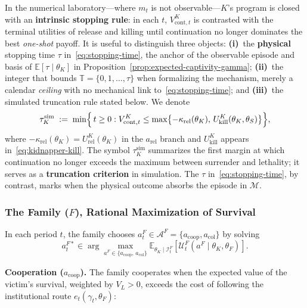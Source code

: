 \documentclass[12pt,a4paper]{article}
\theoremstyle{plain}
\theoremstyle{definition}
\theoremstyle{remark}
\newcommand{\E}{\mathbb{E}}
\newcommand{\1}{\mathbf{1}}
\begin{document}
In the numerical laboratory---where $m_t$ is not observable---$K$'s program is closed with an \textbf{intrinsic stopping rule}: in each $t$, $V^K_{\mathrm{cont},t}$ is contrasted with the terminal utilities of release and killing until continuation no longer dominates the best \emph{one-shot} payoff. It is useful to distinguish three objects: \textbf{(i)}~the \textbf{physical} stopping time $\tau$ in~\eqref{eq:stopping-time}, the anchor of the observable episode and basis of $\mathbb{E}[\tau\mid\theta_K]$ in Proposition~\ref{prop:expected-captivity-gamma}; \textbf{(ii)}~the integer that bounds $\mathbb{T}=\{0,1,\ldots,\tau\}$ when formalizing the mechanism, merely a calendar \emph{ceiling} with no mechanical link to~\eqref{eq:stopping-time}; and \textbf{(iii)}~the simulated truncation rule stated below. We denote
\begin{equation}
\label{eq:tau-K-pure-simulation}
\tau_K^{\mathrm{sim}}
\;:=\;
\min\Bigl\{\, t\ge 0 : V^K_{\mathrm{cont},t} \le \max\bigl\{-\kappa_{\mathrm{rel}}(\theta_K),\,U^K_{\mathrm{kill}}(\theta_K,\theta_S)\bigr\} \Bigr\},
\end{equation}
where $-\kappa_{\mathrm{rel}}(\theta_K)=U^K_{\mathrm{rel}}(\theta_K)$ in the $a_{\mathrm{rel}}$ branch and $U^K_{\mathrm{kill}}$ appears in~\eqref{eq:kidnapper-kill}. The symbol $\tau_K^{\mathrm{sim}}$ summarizes the first margin at which continuation no longer exceeds the maximum between surrender and lethality; it serves as a \textbf{truncation criterion} in simulation. The $\tau$ in~\eqref{eq:stopping-time}, by contrast, marks when the physical outcome absorbs the episode in $\mathcal{M}$.

\subsubsection[The family F]{The Family ($F$), Rational Maximization of Survival}
In each period $t$, the family chooses $a_t^F\in\mathcal{A}^F=\{a_{\mathrm{coop}},a_{\mathrm{col}}\}$ by solving
\begin{equation}
\label{eq:family-argmax-bayes}
    a_t^{F\ast}
    \in \arg \max_{a^F \in \{a_{\mathrm{coop}},\, a_{\mathrm{col}}\}}
    \E_{\theta_K \mid \mathcal{I}_t^F}
    \left[
    \mathcal{U}^F_t(a^F \mid \theta_K, \theta_F)
    \right].
\end{equation}

\noindent \textbf{Cooperation ($a_{\mathrm{coop}}$).} The family cooperates when the expected value of the victim's survival, weighted by $V_L>0$, exceeds the cost of following the institutional route $e_t(\gamma_t,\theta_F)$:
\end{document}

